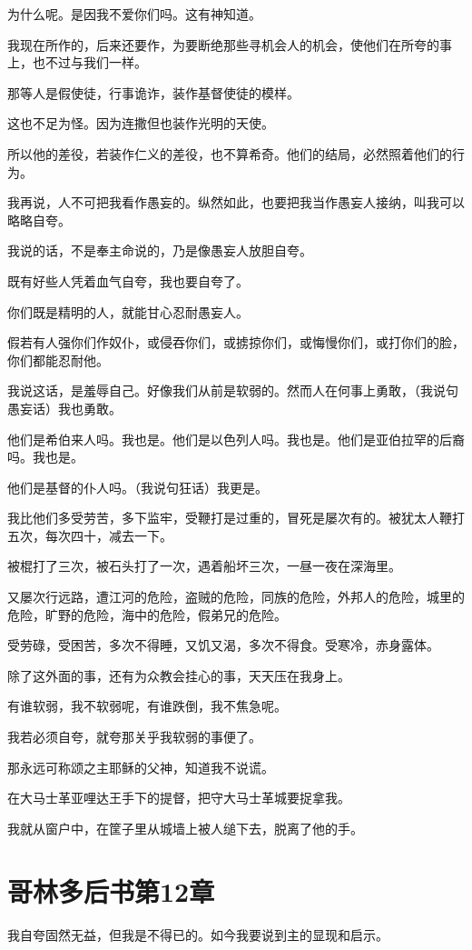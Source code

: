 \documentclass[12pt,oneside]{book}
\begin{document}
为什么呢。是因我不爱你们吗。这有神知道。

我现在所作的，后来还要作，为要断绝那些寻机会人的机会，使他们在所夸的事上，也不过与我们一样。

那等人是假使徒，行事诡诈，装作基督使徒的模样。

这也不足为怪。因为连撒但也装作光明的天使。

所以他的差役，若装作仁义的差役，也不算希奇。他们的结局，必然照着他们的行为。

我再说，人不可把我看作愚妄的。纵然如此，也要把我当作愚妄人接纳，叫我可以略略自夸。

我说的话，不是奉主命说的，乃是像愚妄人放胆自夸。

既有好些人凭着血气自夸，我也要自夸了。

你们既是精明的人，就能甘心忍耐愚妄人。

假若有人强你们作奴仆，或侵吞你们，或掳掠你们，或悔慢你们，或打你们的脸，你们都能忍耐他。

我说这话，是羞辱自己。好像我们从前是软弱的。然而人在何事上勇敢，（我说句愚妄话）我也勇敢。

他们是希伯来人吗。我也是。他们是以色列人吗。我也是。他们是亚伯拉罕的后裔吗。我也是。

他们是基督的仆人吗。（我说句狂话）我更是。

我比他们多受劳苦，多下监牢，受鞭打是过重的，冒死是屡次有的。被犹太人鞭打五次，每次四十，减去一下。

被棍打了三次，被石头打了一次，遇着船坏三次，一昼一夜在深海里。

又屡次行远路，遭江河的危险，盗贼的危险，同族的危险，外邦人的危险，城里的危险，旷野的危险，海中的危险，假弟兄的危险。

受劳碌，受困苦，多次不得睡，又饥又渴，多次不得食。受寒冷，赤身露体。

除了这外面的事，还有为众教会挂心的事，天天压在我身上。

有谁软弱，我不软弱呢，有谁跌倒，我不焦急呢。

我若必须自夸，就夸那关乎我软弱的事便了。

那永远可称颂之主耶稣的父神，知道我不说谎。

在大马士革亚哩达王手下的提督，把守大马士革城要捉拿我。

我就从窗户中，在筐子里从城墙上被人缒下去，脱离了他的手。

\chapter{哥林多后书第12章}
我自夸固然无益，但我是不得已的。如今我要说到主的显现和启示。
\end{document}
